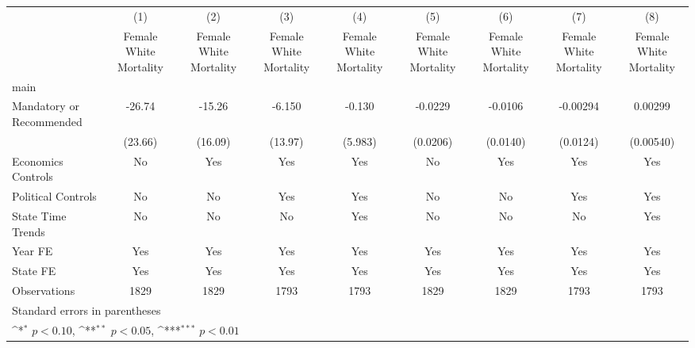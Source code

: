 {
\def\sym#1{\ifmmode^{#1}\else\(^{#1}\)\fi}
\begin{longtable}{l*{8}{c}}
\hline\hline\endfirsthead\hline\endhead\hline\endfoot\endlastfoot
                    &\multicolumn{1}{c}{(1)}&\multicolumn{1}{c}{(2)}&\multicolumn{1}{c}{(3)}&\multicolumn{1}{c}{(4)}&\multicolumn{1}{c}{(5)}&\multicolumn{1}{c}{(6)}&\multicolumn{1}{c}{(7)}&\multicolumn{1}{c}{(8)}\\
                    &\multicolumn{1}{c}{Female White Mortality}&\multicolumn{1}{c}{Female White Mortality}&\multicolumn{1}{c}{Female White Mortality}&\multicolumn{1}{c}{Female White Mortality}&\multicolumn{1}{c}{Female White Mortality}&\multicolumn{1}{c}{Female White Mortality}&\multicolumn{1}{c}{Female White Mortality}&\multicolumn{1}{c}{Female White Mortality}\\
\hline
main                &                     &                     &                     &                     &                     &                     &                     &                     \\
Mandatory or Recommended&      -26.74         &      -15.26         &      -6.150         &      -0.130         &     -0.0229         &     -0.0106         &    -0.00294         &     0.00299         \\
                    &     (23.66)         &     (16.09)         &     (13.97)         &     (5.983)         &    (0.0206)         &    (0.0140)         &    (0.0124)         &   (0.00540)         \\
[1em]
Economics Controls  &          No         &         Yes         &         Yes         &         Yes         &          No         &         Yes         &         Yes         &         Yes         \\
[1em]
Political Controls  &          No         &          No         &         Yes         &         Yes         &          No         &          No         &         Yes         &         Yes         \\
[1em]
State Time Trends   &          No         &          No         &          No         &         Yes         &          No         &          No         &          No         &         Yes         \\
[1em]
Year FE             &         Yes         &         Yes         &         Yes         &         Yes         &         Yes         &         Yes         &         Yes         &         Yes         \\
[1em]
State FE            &         Yes         &         Yes         &         Yes         &         Yes         &         Yes         &         Yes         &         Yes         &         Yes         \\
\hline
Observations        &        1829         &        1829         &        1793         &        1793         &        1829         &        1829         &        1793         &        1793         \\
\hline\hline
\multicolumn{9}{l}{\footnotesize Standard errors in parentheses}\\
\multicolumn{9}{l}{\footnotesize \sym{*} \(p<0.10\), \sym{**} \(p<0.05\), \sym{***} \(p<0.01\)}\\
\end{longtable}
}
